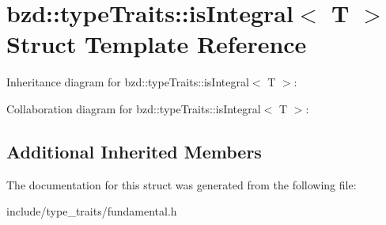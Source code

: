 \hypertarget{structbzd_1_1typeTraits_1_1isIntegral}{}\section{bzd\+:\+:type\+Traits\+:\+:is\+Integral$<$ T $>$ Struct Template Reference}
\label{structbzd_1_1typeTraits_1_1isIntegral}


Inheritance diagram for bzd\+:\+:type\+Traits\+:\+:is\+Integral$<$ T $>$\+:


Collaboration diagram for bzd\+:\+:type\+Traits\+:\+:is\+Integral$<$ T $>$\+:
\subsection*{Additional Inherited Members}


The documentation for this struct was generated from the following file\+:\begin{DoxyCompactItemize}
\item 
include/type\+\_\+traits/fundamental.\+h\end{DoxyCompactItemize}
